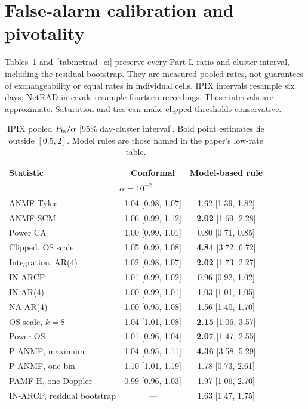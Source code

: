 \documentclass[10pt]{article}
\begin{document}
\section{False-alarm calibration and pivotality}
Tables~\ref{tab:ipix_ci} and~\ref{tab:netrad_ci} preserve every Part-L ratio and cluster interval, including the residual bootstrap. They are measured pooled rates, not guarantees of exchangeability or equal rates in individual cells. IPIX intervals resample six days; NetRAD intervals resample fourteen recordings. These intervals are approximate. Saturation and ties can make clipped thresholds conservative.


\begin{table}[htbp]
\centering\small
\caption{IPIX pooled $P_{\rm fa}/\alpha$ [95\% day-cluster interval]. Bold point estimates lie outside $[0.5,2]$. Model rules are those named in the paper's low-rate table.}\label{tab:ipix_ci}
\begin{tabular}{lcc}
\toprule
Statistic & Conformal & Model-based rule\\
\midrule\multicolumn{3}{c}{$\alpha=10^{-2}$}\\
ANMF-Tyler & 1.04 [0.98, 1.07] & 1.62 [1.39, 1.82] \\
ANMF-SCM & 1.06 [0.99, 1.12] & \textbf{2.02} [1.69, 2.28] \\
Power CA & 1.00 [0.99, 1.01] & 0.80 [0.71, 0.85] \\
Clipped, OS scale & 1.05 [0.99, 1.08] & \textbf{4.84} [3.72, 6.72] \\
Integration, AR(4) & 1.02 [0.98, 1.07] & \textbf{2.02} [1.73, 2.27] \\
IN-ARCP & 1.01 [0.99, 1.02] & 0.96 [0.92, 1.02] \\
IN-AR(4) & 1.00 [0.99, 1.01] & 1.03 [1.01, 1.05] \\
NA-AR(4) & 1.00 [0.95, 1.08] & 1.56 [1.40, 1.70] \\
OS scale, $k=8$ & 1.04 [1.01, 1.08] & \textbf{2.15} [1.06, 3.57] \\
Power OS & 1.01 [0.96, 1.04] & \textbf{2.07} [1.47, 2.55] \\
P-ANMF, maximum & 1.04 [0.95, 1.11] & \textbf{4.36} [3.58, 5.29] \\
P-ANMF, one bin & 1.10 [1.01, 1.19] & 1.78 [0.73, 2.61] \\
PAMF-H, one Doppler & 0.99 [0.96, 1.03] & 1.97 [1.06, 2.70] \\
IN-ARCP, residual bootstrap & --- & 1.63 [1.47, 1.75] \\

\end{tabular}
\end{table}
\end{document}

